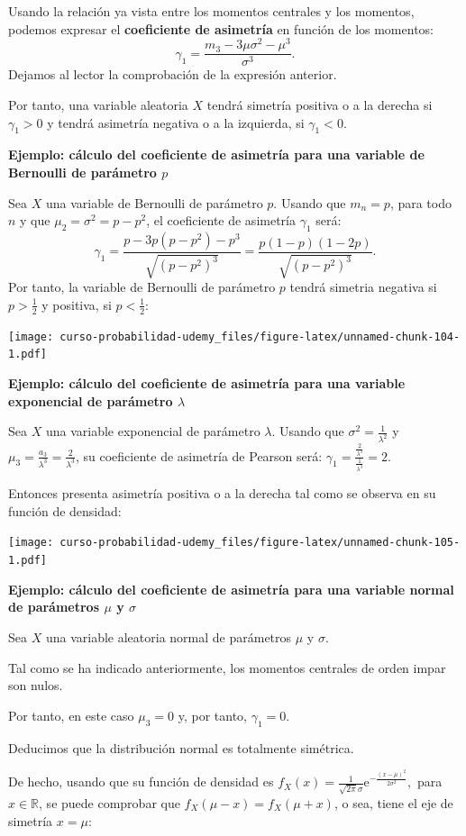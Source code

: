 \documentclass[]{book}
\begin{document}
Usando la relación ya vista entre los momentos centrales y los momentos, podemos expresar el \textbf{coeficiente de asimetría} en función de los momentos:
\[
\gamma_1 = \frac{m_3 -3\mu\sigma^2-\mu^3}{\sigma^3}.
\]
Dejamos al lector la comprobación de la expresión anterior.

Por tanto, una variable aleatoria \(X\) tendrá simetría positiva o a la derecha si \(\gamma_1 >0\) y tendrá asimetría negativa o a la izquierda, si \(\gamma_1 <0\).

\textbf{Ejemplo: cálculo del coeficiente de asimetría para una variable de Bernoulli de parámetro \(p\)}

Sea \(X\) una variable de Bernoulli de parámetro \(p\). Usando que \(m_n =p\), para todo \(n\) y que \(\mu_2 = \sigma^2 = p-p^2\), el coeficiente de asimetría \(\gamma_1\) será:
\[
\gamma_1 = \frac{p-3p(p-p^2)-p^3}{\sqrt{(p-p^2)^3}} = \frac{p (1-p) (1-2p)}{{\sqrt{(p-p^2)^3}}}.
\]
Por tanto, la variable de Bernoulli de parámetro \(p\) tendrá simetria negativa si \(p>\frac{1}{2}\) y positiva, si \(p<\frac{1}{2}\):

\texttt{[image: curso-probabilidad-udemy\_files/figure-latex/unnamed-chunk-104-1.pdf]}

\textbf{Ejemplo: cálculo del coeficiente de asimetría para una variable exponencial de parámetro \(\lambda\)}

Sea \(X\) una variable exponencial de parámetro \(\lambda\).
Usando que \(\sigma^2=\frac{1}{\lambda^2}\) y \(\mu_3 =\frac{a_3}{\lambda^3}=\frac{2}{\lambda^3}\), su coeficiente de asimetría de Pearson será:
\(\gamma_1 = \frac{\frac{2}{\lambda^3}}{\frac{1}{\lambda^3}}=2.\)

Entonces presenta asimetría positiva o a la derecha tal como se observa en su función de densidad:

\texttt{[image: curso-probabilidad-udemy\_files/figure-latex/unnamed-chunk-105-1.pdf]}

\textbf{Ejemplo: cálculo del coeficiente de asimetría para una variable normal de parámetros \(\mu\) y \(\sigma\)}

Sea \(X\) una variable aleatoria normal de parámetros \(\mu\) y \(\sigma\).

Tal como se ha indicado anteriormente, los momentos centrales de orden impar son nulos.

Por tanto, en este caso \(\mu_3=0\) y, por tanto, \(\gamma_1=0\).

Deducimos que la distribución normal es totalmente simétrica.

De hecho, usando que su función de densidad es \(f_X(x)=\frac{1}{\sqrt{2\pi}\sigma}\mathrm{e}^{-\frac{(x-\mu)^2}{2\sigma^2}},\) para \(x\in \mathbb{R}\), se puede comprobar que \(f_X(\mu-x)=f_X(\mu +x)\), o sea, tiene el eje de simetría \(x=\mu\):
\end{document}
